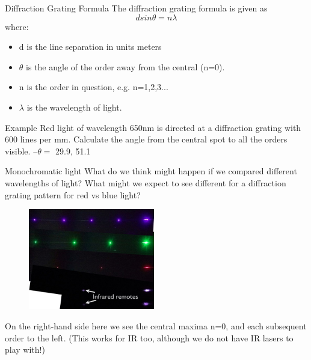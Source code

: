 \documentclass[../Main.tex]{subfiles}
\begin{document}
\begin{frame}{Diffraction Grating Formula}
    The diffraction grating formula is given as
    \begin{equation*}
        d sin\theta = n\lambda
    \end{equation*}
    where:
    \begin{itemize}
        \item d is the line separation in units meters
        \item $\theta$ is the angle of the order away from the central (n=0).
        \item n is the order in question, e.g. n=1,2,3...
        \item $\lambda$ is the wavelength of light.
    \end{itemize}
    \begin{exampleblock}{Example}
        Red light of wavelength 650nm is directed at a diffraction grating with 600 lines per mm. Calculate the angle from the central spot to all the orders visible. %
        --$\theta = $ 29.9, 51.1
    \end{exampleblock}
\end{frame}

\begin{frame}{Monochromatic light}
    What do we think might happen if we compared different wavelengths of light? What might we expect to see different for a diffraction grating pattern for red vs blue light?
    \begin{figure}
        \centering
        \includegraphics[width=5.5cm]{Waves_Images/differentlasersgrating.jpg}
    \end{figure}
    On the right-hand side here we see the central maxima n=0, and each subsequent order to the left. (This works for IR too, although we do not have IR lasers to play with!)
\end{frame}
\end{document}
